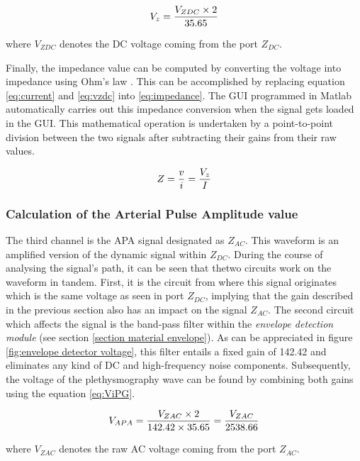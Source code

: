 \begin{align}
	\label{eq:vzdc}
	V_z = \frac{V_{ZDC} \times 2}{35.65} \tagaddtext{[\si{\volt}]}
\end{align}

where $V_{ZDC}$ denotes the DC voltage coming from the port $Z_{DC}$.

Finally, the impedance value can be computed by converting the voltage into impedance using Ohm's law \cite{ohm1827galvanische}. This can be accomplished by replacing equation \ref{eq:current} and \ref{eq:vzdc} into \ref{eq:impedance}. The GUI programmed in Matlab automatically carries out this impedance conversion when the signal gets loaded in the GUI. This mathematical operation is undertaken by a point-to-point division between the two signals after subtracting their gains from their raw values. 

\begin{align}
	\label{eq:impedance}
	Z = \frac{v}{i}=\frac{V_z}{I} \tagaddtext{[\si{\ohm}]}
\end{align}

\subsubsection{Calculation of the Arterial Pulse Amplitude value}
The third channel is the APA signal designated as $Z_{AC}$. This waveform is an amplified version of the dynamic signal within $Z_{DC}$. During the course of analysing the signal's path, it can be seen that thetwo circuits work on the waveform in tandem. First, it is the circuit from where this signal originates which is the same voltage as seen in port $Z_{DC}$, implying that the gain described in the previous section also has an impact on the signal $Z_{AC}$. The second circuit which affects the signal is the band-pass filter within the \textit{envelope detection module} (see section \ref{section material envelope}). As can be appreciated in figure \ref{fig:envelope detector voltage}, this filter entails a fixed gain of \num{142.42} and eliminates any kind of DC and high-frequency noise components. Subsequently, the voltage of the plethysmography wave can be found by combining both gains using the equation \ref{eq:ViPG}.

\begin{align}
	\label{eq:ViPG}
	V_{APA} = \frac{V_{ZAC} \times 2}{142.42 \times 35.65}=\frac{V_{ZAC}}{2538.66} \tagaddtext{[\si{\volt}]}
\end{align}

where $V_{ZAC}$ denotes the raw AC voltage coming from the port $Z_{AC}$.

